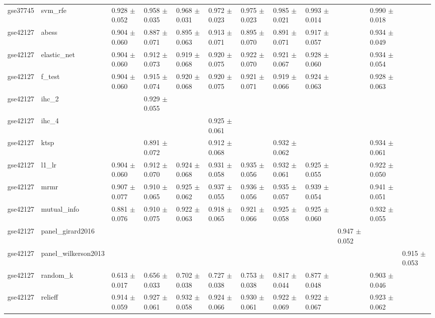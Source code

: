 \begin{table}[t]
\begin{tabular}{llllllllllll}
    gse37745 & svm\_rfe & 0.928 $\pm$ 0.052 & 0.958 $\pm$ 0.035 & 0.968 $\pm$ 0.031 & 0.972 $\pm$ 0.023 & 0.975 $\pm$ 0.023 & 0.985 $\pm$ 0.021 & 0.993 $\pm$ 0.014 &  & 0.990 $\pm$ 0.018 &  \\
    gse42127 & abess & 0.904 $\pm$ 0.060 & 0.887 $\pm$ 0.071 & 0.895 $\pm$ 0.063 & 0.913 $\pm$ 0.071 & 0.895 $\pm$ 0.070 & 0.891 $\pm$ 0.071 & 0.917 $\pm$ 0.057 &  & 0.934 $\pm$ 0.049 &  \\
    gse42127 & elastic\_net & 0.904 $\pm$ 0.060 & 0.912 $\pm$ 0.073 & 0.919 $\pm$ 0.068 & 0.920 $\pm$ 0.075 & 0.922 $\pm$ 0.070 & 0.921 $\pm$ 0.067 & 0.928 $\pm$ 0.060 &  & 0.934 $\pm$ 0.054 &  \\
    gse42127 & f\_test & 0.904 $\pm$ 0.060 & 0.915 $\pm$ 0.074 & 0.920 $\pm$ 0.068 & 0.920 $\pm$ 0.075 & 0.921 $\pm$ 0.071 & 0.919 $\pm$ 0.066 & 0.924 $\pm$ 0.063 &  & 0.928 $\pm$ 0.063 &  \\
    gse42127 & ihc\_2 &  & 0.929 $\pm$ 0.055 &  &  &  &  &  &  &  &  \\
    gse42127 & ihc\_4 &  &  &  & 0.925 $\pm$ 0.061 &  &  &  &  &  &  \\
    gse42127 & ktsp &  & 0.891 $\pm$ 0.072 &  & 0.912 $\pm$ 0.068 &  & 0.932 $\pm$ 0.062 &  &  & 0.934 $\pm$ 0.061 &  \\
    gse42127 & l1\_lr & 0.904 $\pm$ 0.060 & 0.912 $\pm$ 0.070 & 0.924 $\pm$ 0.068 & 0.931 $\pm$ 0.058 & 0.935 $\pm$ 0.056 & 0.932 $\pm$ 0.061 & 0.925 $\pm$ 0.055 &  & 0.922 $\pm$ 0.050 &  \\
    gse42127 & mrmr & 0.907 $\pm$ 0.077 & 0.910 $\pm$ 0.065 & 0.925 $\pm$ 0.062 & 0.937 $\pm$ 0.055 & 0.936 $\pm$ 0.056 & 0.935 $\pm$ 0.057 & 0.939 $\pm$ 0.054 &  & 0.941 $\pm$ 0.051 &  \\
    gse42127 & mutual\_info & 0.881 $\pm$ 0.076 & 0.910 $\pm$ 0.075 & 0.922 $\pm$ 0.063 & 0.918 $\pm$ 0.065 & 0.921 $\pm$ 0.066 & 0.925 $\pm$ 0.058 & 0.925 $\pm$ 0.060 &  & 0.932 $\pm$ 0.055 &  \\
    gse42127 & panel\_girard2016 &  &  &  &  &  &  &  & 0.947 $\pm$ 0.052 &  &  \\
    gse42127 & panel\_wilkerson2013 &  &  &  &  &  &  &  &  &  & 0.915 $\pm$ 0.053 \\
    gse42127 & random\_k & 0.613 $\pm$ 0.017 & 0.656 $\pm$ 0.033 & 0.702 $\pm$ 0.038 & 0.727 $\pm$ 0.038 & 0.753 $\pm$ 0.038 & 0.817 $\pm$ 0.044 & 0.877 $\pm$ 0.048 &  & 0.903 $\pm$ 0.046 &  \\
    gse42127 & relieff & 0.914 $\pm$ 0.059 & 0.927 $\pm$ 0.061 & 0.932 $\pm$ 0.058 & 0.924 $\pm$ 0.066 & 0.930 $\pm$ 0.061 & 0.922 $\pm$ 0.069 & 0.922 $\pm$ 0.067 &  & 0.923 $\pm$ 0.062 &  \\

\end{tabular}
\end{table}
